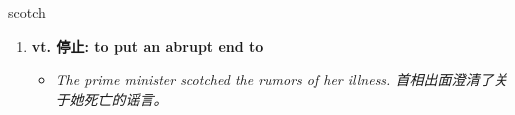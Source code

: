 
\begin{frame}
{\huge scotch}
\begin{center}
\begin{enumerate}\Large
  \item \textbf{vt. 停止: to put an abrupt end to}
  \begin{itemize}
    \item \em{\Large{The prime minister scotched the rumors of her illness. 首相出面澄清了关于她死亡的谣言。}}
  \end{itemize}
\end{enumerate}
\end{center}
\end{frame}
